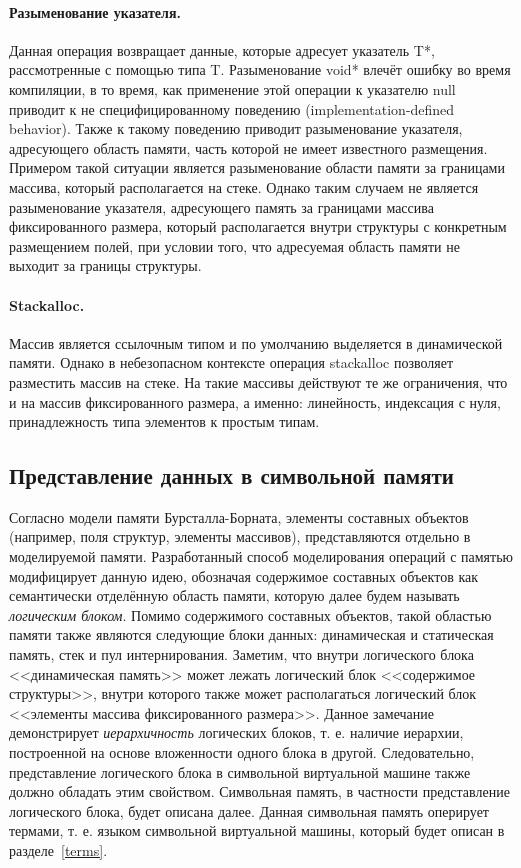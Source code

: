 \paragraph{Разыменование указателя.}
Данная операция возвращает данные, которые адресует указатель T*, рассмотренные с помощью типа T. Разыменование void* влечёт ошибку во время компиляции, в то время, как применение этой операции к указателю null приводит к не специфицированному поведению (implementation-defined behavior). Также к такому поведению приводит разыменование указателя, адресующего область памяти, часть которой не имеет известного размещения. Примером такой ситуации является разыменование области памяти за границами массива, который располагается на стеке. Однако таким случаем не является разыменование указателя, адресующего память за границами массива фиксированного размера, который располагается внутри структуры с конкретным размещением полей, при условии того, что адресуемая область памяти не выходит за границы структуры.

\paragraph{Stackalloc.}
Массив является ссылочным типом и по умолчанию выделяется в динамической памяти. Однако в небезопасном контексте операция stackalloc позволяет разместить массив на стеке. На такие массивы действуют те же ограничения, что и на массив фиксированного размера, а именно: линейность, индексация с нуля, принадлежность типа элементов к простым типам.


\subsection{Представление данных в символьной памяти}

Согласно модели памяти Бурсталла-Борната, элементы составных объектов (например, поля структур, элементы массивов), представляются отдельно в моделируемой памяти. Разработанный способ моделирования операций с памятью модифицирует данную идею, обозначая содержимое составных объектов как семантически отделённую область памяти, которую далее будем называть \emph{логическим блоком}. Помимо содержимого составных объектов, такой областью памяти также являются следующие блоки данных: динамическая и статическая память, стек и пул интернирования. Заметим, что внутри логического блока <<динамическая память>> может лежать логический блок <<содержимое структуры>>, внутри которого также может располагаться логический блок <<элементы массива фиксированного размера>>. Данное замечание демонстрирует \emph{иерархичность} логических блоков, т. е. наличие иерархии, построенной на основе вложенности одного блока в другой. Следовательно, представление логического блока в символьной виртуальной машине также должно обладать этим свойством. Символьная память, в частности представление логического блока, будет описана далее. Данная символьная память оперирует термами, т. е. языком символьной виртуальной машины, который будет описан в разделе~\ref{terms}.

